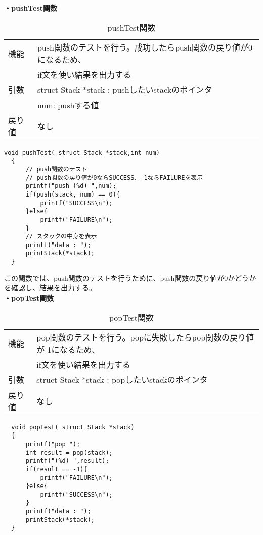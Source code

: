 \documentclass[dvipdfmx]{jsarticle}
\begin{document}
\textbf{・pushTest関数}
\begin{table}[ht]
  \centering
  \caption{pushTest関数}
  \begin{tabular}{|p{5cm}|p{10cm}|}
    \hline
    機能  & push関数のテストを行う。成功したらpush関数の戻り値が0になるため、   \\ &if文を使い結果を出力する           \\
    \hline
    引数  & struct Stack *stack : pushしたいstackのポインタ \\
        & num: pushする値                            \\
    \hline
    戻り値 & なし                                      \\
    \hline
  \end{tabular}
  \label{tab:pushtest_func}
\end{table}
\begin{lstlisting}[caption={pushTest関数}, label={lst:pushtest_func}]
  void pushTest( struct Stack *stack,int num)
  {
      // push関数のテスト
      // push関数の戻り値が0ならSUCCESS、-1ならFAILUREを表示
      printf("push (%d) ",num);
      if(push(stack, num) == 0){
          printf("SUCCESS\n");
      }else{
          printf("FAILURE\n");
      }
      // スタックの中身を表示
      printf("data : ");
      printStack(*stack);
  }
\end{lstlisting}
この関数では、push関数のテストを行うために、push関数の戻り値が0かどうかを確認し、結果を出力する。
\\
\textbf{・popTest関数}
\begin{table}[ht]
  \centering
  \caption{popTest関数}
  \begin{tabular}{|p{5cm}|p{10cm}|}
    \hline
    機能  & pop関数のテストを行う。popに失敗したらpop関数の戻り値が-1になるため、 \\ & if文を使い結果を出力する            \\
    \hline
    引数  & struct Stack *stack : popしたいstackのポインタ   \\
    \hline
    戻り値 & なし                                       \\
    \hline
  \end{tabular}
  \label{tab:poptest_func}
\end{table}
\newpage
\begin{lstlisting}
  void popTest( struct Stack *stack)
  {
      printf("pop ");
      int result = pop(stack);
      printf("(%d) ",result);
      if(result == -1){
          printf("FAILURE\n");
      }else{
          printf("SUCCESS\n");
      }
      printf("data : ");
      printStack(*stack);
  }
\end{lstlisting}
\newpage
\clearpage
\end{document}
